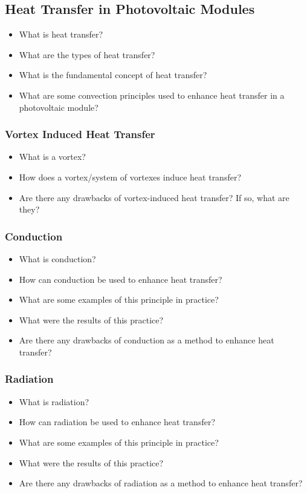 \subsection{Heat Transfer in Photovoltaic Modules}
\begin{itemize}
    \item What is heat transfer?
    \item What are the types of heat transfer?
    \item What is the fundamental concept of heat transfer?
    \item What are some convection principles used to enhance heat transfer in a photovoltaic module?
\end{itemize}

\subsubsection{Vortex Induced Heat Transfer}
\begin{itemize}
    \item What is a vortex?
    \item How does a vortex/system of vortexes induce heat transfer?
    \item Are there any drawbacks of vortex-induced heat transfer? If so, what are they?
\end{itemize}

\subsubsection{Conduction}
\begin{itemize}
    \item What is conduction?
    \item How can conduction be used to enhance heat transfer?
    \item What are some examples of this principle in practice?
    \item What were the results of this practice?
    \item Are there any drawbacks of conduction as a method to enhance heat transfer?
\end{itemize}

\subsubsection{Radiation}
\begin{itemize}
    \item What is radiation?
    \item How can radiation be used to enhance heat transfer?
    \item What are some examples of this principle in practice?
    \item What were the results of this practice?
    \item Are there any drawbacks of radiation as a method to enhance heat transfer?
\end{itemize}

